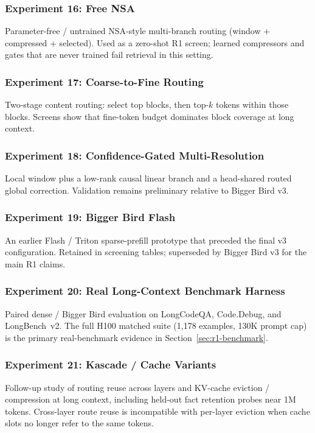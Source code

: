 \documentclass[11pt]{article}
\begin{document}
\subsubsection*{Experiment 16: Free NSA}
Parameter-free / untrained NSA-style multi-branch routing (window +
compressed + selected). Used as a zero-shot R1 screen; learned compressors
and gates that are never trained fail retrieval in this setting.

\subsubsection*{Experiment 17: Coarse-to-Fine Routing}
Two-stage content routing: select top blocks, then top-$k$ tokens within
those blocks. Screens show that fine-token budget dominates block coverage at
long context.

\subsubsection*{Experiment 18: Confidence-Gated Multi-Resolution}
Local window plus a low-rank causal linear branch and a head-shared routed
global correction. Validation remains preliminary relative to Bigger Bird v3.

\subsubsection*{Experiment 19: Bigger Bird Flash}
An earlier Flash / Triton sparse-prefill prototype that preceded the final
v3 configuration. Retained in screening tables; superseded by Bigger Bird v3
for the main R1 claims.


\subsubsection*{Experiment 20: Real Long-Context Benchmark Harness}
Paired dense / Bigger Bird evaluation on LongCodeQA, Code.Debug, and
LongBench~v2. The full H100 matched suite (1{,}178 examples, 130K prompt cap)
is the primary real-benchmark evidence in Section~\ref{sec:r1-benchmark}.

\subsubsection*{Experiment 21: Kascade / Cache Variants}
Follow-up study of routing reuse across layers and KV-cache eviction /
compression at long context, including held-out fact retention probes near
1M tokens. Cross-layer route reuse is incompatible with per-layer eviction
when cache slots no longer refer to the same tokens.
\newpage
\end{document}
